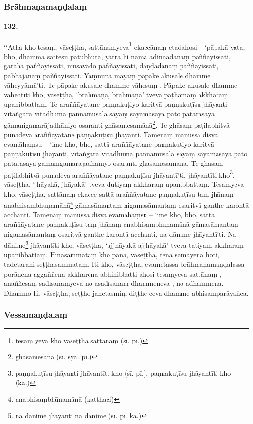 \subsubsection{Brāhmaṇamaṇḍalaṃ}

\paragraph{132.} ‘‘Atha kho tesaṃ, vāseṭṭha, sattānaṃyeva\footnote{tesaṃ yeva kho vāseṭṭha sattānaṃ (sī. pī.)} ekaccānaṃ etadahosi – ‘pāpakā vata, bho, dhammā sattesu pātubhūtā, yatra hi nāma adinnādānaṃ paññāyissati, garahā paññāyissati, musāvādo paññāyissati, daṇḍādānaṃ paññāyissati, pabbājanaṃ paññāyissati. Yaṃnūna mayaṃ pāpake akusale dhamme vāheyyāmā’ti. Te pāpake akusale dhamme vāhesuṃ . Pāpake akusale dhamme vāhentīti kho, vāseṭṭha, ‘brāhmaṇā, brāhmaṇā’ tveva paṭhamaṃ akkharaṃ upanibbattaṃ. Te araññāyatane paṇṇakuṭiyo karitvā paṇṇakuṭīsu jhāyanti vītaṅgārā vītadhūmā pannamusalā sāyaṃ sāyamāsāya pāto pātarāsāya gāmanigamarājadhāniyo osaranti ghāsamesamānā\footnote{ghāsamesanā (sī. syā. pī.)}. Te ghāsaṃ paṭilabhitvā punadeva araññāyatane paṇṇakuṭīsu jhāyanti. Tamenaṃ manussā disvā evamāhaṃsu – ‘ime kho, bho, sattā araññāyatane paṇṇakuṭiyo karitvā paṇṇakuṭīsu jhāyanti, vītaṅgārā vītadhūmā pannamusalā sāyaṃ sāyamāsāya pāto pātarāsāya gāmanigamarājadhāniyo osaranti ghāsamesamānā. Te ghāsaṃ paṭilabhitvā punadeva araññāyatane paṇṇakuṭīsu jhāyantī’ti, jhāyantīti kho\footnote{paṇṇakuṭīsu jhāyanti jhāyantīti kho (sī. pī.), paṇṇakuṭīsu jhāyantīti kho (ka.)}, vāseṭṭha, ‘jhāyakā, jhāyakā’ tveva dutiyaṃ akkharaṃ upanibbattaṃ. Tesaṃyeva kho, vāseṭṭha, sattānaṃ ekacce sattā araññāyatane paṇṇakuṭīsu taṃ jhānaṃ anabhisambhuṇamānā\footnote{anabhisaṃbhūnamānā (katthaci)} gāmasāmantaṃ nigamasāmantaṃ osaritvā ganthe karontā acchanti. Tamenaṃ manussā disvā evamāhaṃsu – ‘ime kho, bho, sattā araññāyatane paṇṇakuṭīsu taṃ jhānaṃ anabhisambhuṇamānā gāmasāmantaṃ nigamasāmantaṃ osaritvā ganthe karontā acchanti, na dānime jhāyantī’ti. Na dānime\footnote{na dānime jhāyantī na dānime (sī. pī. ka.)} jhāyantīti kho, vāseṭṭha, ‘ajjhāyakā ajjhāyakā’ tveva tatiyaṃ akkharaṃ upanibbattaṃ. Hīnasammataṃ kho pana, vāseṭṭha, tena samayena hoti, tadetarahi seṭṭhasammataṃ. Iti kho, vāseṭṭha, evametassa brāhmaṇamaṇḍalassa porāṇena aggaññena akkharena abhinibbatti ahosi tesaṃyeva sattānaṃ , anaññesaṃ sadisānaṃyeva no asadisānaṃ dhammeneva , no adhammena. Dhammo hi, vāseṭṭha, seṭṭho janetasmiṃ diṭṭhe ceva dhamme abhisamparāyañca.

\subsubsection{Vessamaṇḍalaṃ}

